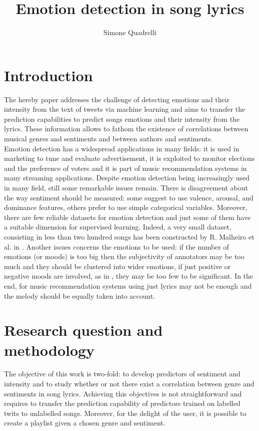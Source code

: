 \documentclass[runningheads]{llncs}
\begin{document}
\title{Emotion detection in song lyrics}


\author{Simone Quadrelli}


\maketitle            

\section{Introduction}
The hereby paper addresses the challenge of detecting emotions and their intensity from the text of tweets via machine learning and aims to transfer the prediction capabilities to predict songs emotions and their intensity from the lyrics. These information allows to fathom the existence of correlations between musical genres and sentiments and between authors and sentiments.\\

Emotion detection has a widespread applications in many fields: it is used in marketing to tune and evaluate advertisement, it is exploited to monitor elections and the preference of voters and it is part of music recommendation systems in many streaming applications. 
Despite emotion detection being increasingly used in many field, still some remarkable issues remain. There is disagreement about the way sentiment should be measured: some suggest to use valence, arousal, and dominance features, others prefer to use simple categorical variables. Moreover, there are few reliable datasets for emotion detection and just some of them have a suitable dimension for supervised learning. Indeed, a very small dataset, consisting in less than two hundred songs has been constructed by R. Malheiro et al. in \cite{musicmood}. Another issues concerns the emotions to be used: if the number of emotions (or moods) is too big then the subjectivity of annotators may be too much and they should be clustered into wider emotions, if just positive or negative moods are involved, as in \cite{musicmood1}, they may be too few to be significant. In the end, for music recommendation systems using just lyrics may not be enough and the melody should be equally taken into account. \\



\section{Research question and methodology}
The objective of this work is two-fold: to develop predictors of sentiment and intensity and to study whether or not there exist a correlation between genre and sentiments in song lyrics. Achieving this objectives is not straightforward and requires to transfer the prediction capability of predictors trained on labelled twits to unlabelled songs. Moreover, for the delight of the user, it is possible to create a playlist given a chosen genre and sentiment. \\
\end{document}
